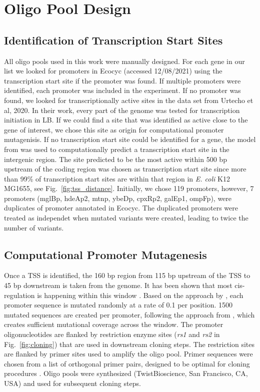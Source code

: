 \section{Oligo Pool Design} \label{sec:oligo_pool}
\subsection{Identification of Transcription Start Sites}
\label{sec:ident_tss}
All oligo pools used in this work were manually designed. For each gene in our list we looked for promoters in Ecocyc \cite{keseler2010ecocyc} (accessed 12/08/2021) using the transcription start site if the promoter was found. If multiple promoters were identified, each promoter was included in the experiment. If no promoter was found, we looked for transcriptionally active sites in the data set from Urtecho et al, 2020\cite{urtecho2020genome}. In their work, every part of the genome was tested for transcription initiation in LB. If we could find a site that was identified as active close to the gene of interest, we chose this site as origin for computational promoter mutagenisis. If no transcription start site could be identified for a gene, the model from \cite{lafleur2022automated} was used to computationally predict a transcription start site in the intergenic region. The site predicted to be the most active within 500 bp upstream of the coding region was chosen as transcription start site since more than 99\% of transcription start sites are within that region in \textit{E. coli} K12 MG1655, see Fig.~\ref{fig:tss_distance}. Initially, we chose 119 promoters, however, 7 promoters (mglBp, hdeAp2, mtnp, ybeDp, cpxRp2, galEp1, ompFp), were duplicates of promoter annotated in Ecocyc. The duplicated promoters were treated as independet when mutated variants were created, leading to twice the number of variants.


\subsection{Computational Promoter Mutagenesis}
\label{sec:comp_prom_muta}
Once a TSS is identified, the 160 bp region from 115 bp upstream of the TSS to 45 bp downstream is taken from the genome. It has been shown that most cis-regulation is happening within this window \cite{rydenfelt2014statistical}. Based on the approach by \cite{kinney2010using}, each promoter sequence is mutated randomly at a rate of 0.1 per position. 1500 mutated sequences are created per promoter, following the approach from \cite{ireland2020deciphering}, which creates sufficient mutational coverage across the window. The promoter oligonucleotides are flanked by restriction enzyme sites (\textit{rs1} and \textit{rs2} in Fig.~\ref{fig:cloning}) that are used in downstream cloning steps. The restriction sites are flanked by primer sites used to amplify the oligo pool. Primer sequences were chosen from a list of orthogonal primer pairs, designed to be optimal for cloning procedures \cite{subramanian2018set}. Oligo pools were synthesized (TwistBioscience, San Francisco, CA, USA) and used for subsequent cloning steps.


